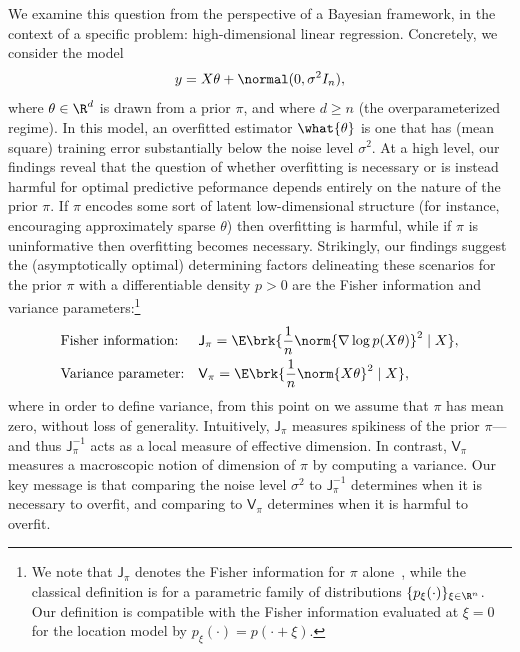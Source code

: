 \documentclass[11pt]{article}
\newcommand{\jfunc}{\mathsf{J}}
\begin{document}
We examine this question from the perspective of a Bayesian framework, in the context of a specific problem: high-dimensional linear regression. Concretely, we consider the model
\[y = X\theta + \normal(0,\sigma^2 I_n),\]
where $\theta\in\R^d$ is drawn from a prior $\pi$, and where $d\geq n$ (the overparameterized regime).
In this model, an overfitted estimator $\what{\theta}$ is one that has (mean square) training error substantially below the noise level $\sigma^2$.
At a high level, our findings reveal that the question of whether overfitting is necessary or is instead harmful for optimal predictive peformance depends entirely on the nature of the prior $\pi$. If $\pi$ encodes some sort of latent low-dimensional structure (for instance, encouraging approximately sparse $\theta$) then overfitting is harmful, while if $\pi$ is uninformative then overfitting becomes necessary. Strikingly, our findings suggest the (asymptotically optimal) determining factors delineating these scenarios for the prior $\pi$ with a differentiable density $p>0$ are the Fisher information and variance parameters:\footnote{We note that $\jfunc_{\pi}$ denotes the Fisher information for $\pi$ alone~\cite[Sec.~C]{dembo2002information}, while the classical definition is for a parametric family of distributions $\{p_\xi(\cdot)\}_{\xi \in \R^n}$. Our definition is compatible with the Fisher information evaluated at $\xi = 0$ for the location model by $p_\xi(\cdot) = p(\cdot + \xi)$.}
\begin{subequations}
\begin{align}
    & \text{Fisher information:} & &   \jfunc_\pi =  \E \brk{\frac{1}{n}\norm{\nabla \log p(X\theta)}^2\mid X} , \label{eq:def-Fisher-parameter} \\
    & \text{Variance parameter:} & & \mathsf{V}_\pi =  \E\brk{\frac{1}{n}\norm{X\theta}^2\mid X}, \label{eq:def-variance-parameter}
\end{align}
\end{subequations}
where in order to define variance, from this point on we assume that $\pi$ has mean zero, without loss of generality.
Intuitively, $\jfunc_\pi$ measures spikiness of the prior $\pi$---and thus $\jfunc_\pi^{-1}$ acts as a local measure of effective dimension. In contrast, $\mathsf{V}_\pi$ measures a macroscopic notion of dimension of $\pi$ by computing a variance. Our key message is that comparing the noise level $\sigma^2$ to $\jfunc_\pi^{-1}$ determines when it is necessary to overfit, and comparing to $\mathsf{V}_\pi$ determines when it is harmful to overfit.
\end{document}
